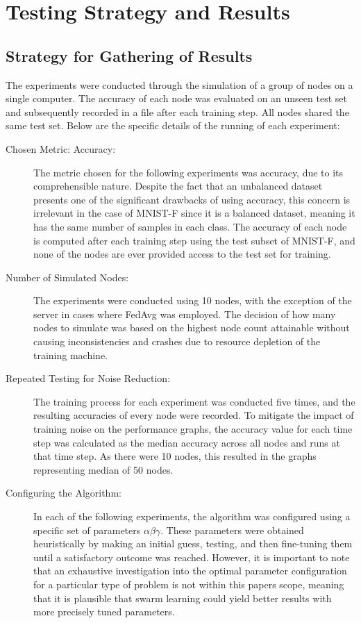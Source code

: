 \chapter{Testing Strategy and Results}
\section{Strategy for Gathering of Results}
The experiments were conducted through the simulation of a group of nodes on a single computer. The accuracy of each node was evaluated on an unseen test set and subsequently recorded in a file after each training step. All nodes shared the same test set. Below are the specific details of the running of each experiment:
\begin{description}
	\item [Chosen Metric: Accuracy:] The metric chosen for the following experiments was accuracy, due to its comprehensible nature. Despite the fact that an unbalanced dataset presents one of the significant drawbacks of using accuracy, this concern is irrelevant in the case of MNIST-F since it is a balanced dataset, meaning it has the same number of samples in each class. The accuracy of each node is computed after each training step using the test subset of MNIST-F, and none of the nodes are ever provided access to the test set for training.
	
	\item [Number of Simulated Nodes:] The experiments were conducted using 10 nodes, with the exception of the server in cases where FedAvg was employed. The decision of how many nodes to simulate was based on the highest node count attainable without causing inconsistencies and crashes due to resource depletion of the training machine.
	
	\item [Repeated Testing for Noise Reduction:] The training process for each experiment was conducted five times, and the resulting accuracies of every node were recorded. To mitigate the impact of training noise on the performance graphs, the accuracy value for each time step was calculated as the median accuracy across all nodes and runs at that time step. As there were 10 nodes, this resulted in the graphs representing median of 50 nodes.
	
	\item [Configuring the Algorithm:] In each of the following experiments, the algorithm was configured using a specific set of parameters $\alpha \beta \gamma$. These parameters were obtained heuristically by making an initial guess, testing, and then fine-tuning them until a satisfactory outcome was reached. However, it is important to note that an exhaustive investigation into the optimal parameter configuration for a particular type of problem is not within this papers scope, meaning that it is plausible that swarm learning could yield better results with more precisely tuned parameters.
	

\end{description}

